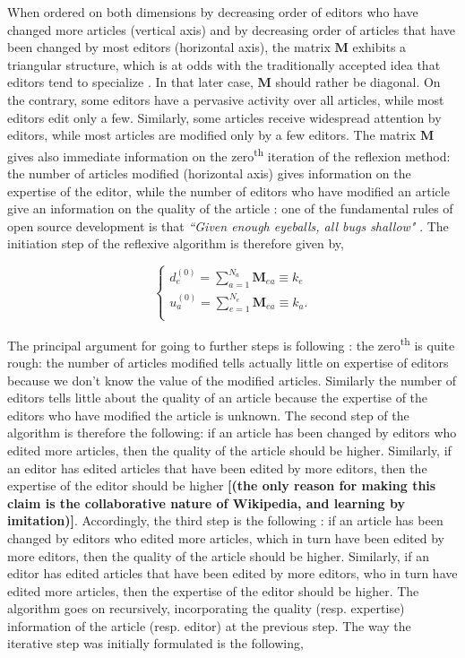 When ordered on both dimensions by decreasing order of editors who have changed more articles (vertical axis) and by decreasing order of articles that have been changed by most editors (horizontal axis), the matrix $\mathbf{M}$ exhibits a triangular structure, which is at odds with the traditionally accepted idea that editors tend to specialize \cite{}. In that later case, $\mathbf{M}$ should rather be diagonal. On the contrary, some editors have a pervasive activity over all articles, while most editors edit only a few. Similarly, some articles receive widespread attention by editors, while most articles are modified only by a few editors. The matrix $\mathbf{M}$ gives also immediate information on the zero\textsuperscript{th} iteration of the reflexion method: the number of articles modified (horizontal axis) gives information on the expertise of the editor, while the number of editors who have modified an article give an information on the quality of the article : one of the fundamental rules of open source development is that {\it ``Given enough eyeballs, all bugs shallow"} \cite{raymond1999}. The initiation step of the reflexive algorithm is therefore given by,

\begin{equation}
\begin{cases}
 d_{e}^{(0)} = \sum_{a=1}^{N_{a}} \mathbf{M}_{ea} \equiv k_e\\
 u_{a}^{(0)} = \sum_{e=1}^{N_{e}} \mathbf{M}_{ea}  \equiv k_a.\\
\end{cases}
\label{HHinit}
\end{equation}

The principal argument for going to further steps is following : the zero\textsuperscript{th} is quite rough: the number of articles modified tells actually little on expertise of editors because we don't know the value of the modified articles. Similarly the number of editors tells little about the quality of an article because the expertise of the editors who have modified the article is unknown. The second step of the algorithm is therefore the following: if an article has been changed by editors who edited more articles, then the quality of the article should be higher. Similarly, if an editor has edited articles that have been edited by more editors, then the expertise of the editor should be higher {\bf [(the only reason for making this claim is the collaborative nature of Wikipedia, and learning by imitation)]}.  Accordingly, the third step is the following : if an article has been changed by editors who edited more articles, which in turn have been edited by more editors, then the quality of the article should be higher. Similarly, if an editor has edited articles that have been edited by more editors, who in turn have edited more articles, then the expertise of the editor should be higher. The algorithm goes on recursively, incorporating the quality (resp. expertise) information of the article (resp. editor) at the previous step. The way the iterative step was initially formulated is the following, 

